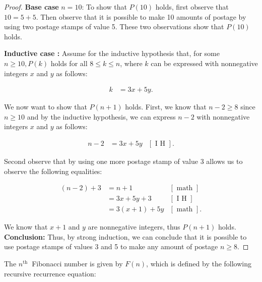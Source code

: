 \documentclass[10pt]{article}
\begin{document}
\begin{enumerate}[label={}]
\begin{proof}
              \textbf{Base case} $n = 10$: To show that $P(10)$ holds, first observe that $10=5+5$. Then observe that it is possible to make 10 amounts of postage by using two postage stamps of value 5. These two observations show that $P(10)$ holds.

              \textbf{Inductive case :} Assume for the inductive hypothesis that, for some $n \geq 10, P(k)$ holds for all $8 \leq k \leq n$, where $k$ can be expressed with nonnegative integers $x$ and $y$ as follows:

              $$
                  \begin{aligned}
                      k & = 3x +5y.
                  \end{aligned}
              $$

              We now want to show that $P(n+1)$ holds.
              First, we know that $n-2 \geq 8$ since $n \geq 10$ and by the inductive hypothesis, we can express $n-2$ with nonnegative integers $x$ and $y$ as follows:

              $$
                  \begin{aligned}
                      n-2 & = 3x + 5y & [\text { I H }].
                  \end{aligned}
              $$


              Second observe that by using one more postage stamp of value 3 allows us to observe the following equalities:

              $$
                  \begin{aligned}
                      (n-2) + 3 & = n + 1       & [\text { math }]  \\
                                & = 3x + 5y + 3 & [\text { I H }]   \\
                                & =3(x+1) + 5y  & [\text { math }].
                  \end{aligned}
              $$


              We know that $x+1$ and $y$ are nonnegative integers, thus $P(n+1)$ holds.\\

              \textbf{Conclusion:} Thus, by strong induction, we can conclude that it is possible to use postage stamps of values 3 and 5 to make any amount of postage $n \geq 8$.
          \end{proof}



          The $n^{\text {th }}$ Fibonacci number is given by $F(n)$, which is defined by the following recursive recurrence equation:


\end{enumerate}
\end{document}
